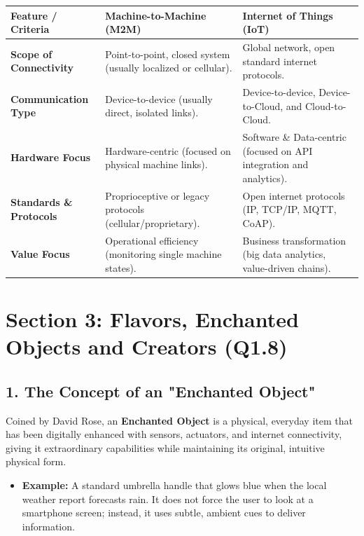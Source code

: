 \begin{table}[H]
\centering
\begin{tabular}{|p{}|p{}|p{}|}
\hline
Feature / Criteria & Machine-to-Machine (M2M) & Internet of Things (IoT) \\
\hline
\textbf{Scope of Connectivity} & Point-to-point, closed system (usually localized or cellular). & Global network, open standard internet protocols. \\
\hline
\textbf{Communication Type} & Device-to-device (usually direct, isolated links). & Device-to-device, Device-to-Cloud, and Cloud-to-Cloud. \\
\hline
\textbf{Hardware Focus} & Hardware-centric (focused on physical machine links). & Software \& Data-centric (focused on API integration and analytics). \\
\hline
\textbf{Standards \& Protocols} & Proprioceptive or legacy protocols (cellular/proprietary). & Open internet protocols (IP, TCP/IP, MQTT, CoAP). \\
\hline
\textbf{Value Focus} & Operational efficiency (monitoring single machine states). & Business transformation (big data analytics, value-driven chains). \\
\hline
\end{tabular}
\end{table}


\section{Section 3: Flavors, Enchanted Objects and Creators (Q1.8)}

\subsection{1. The Concept of an "Enchanted Object"}
Coined by David Rose, an \textbf{Enchanted Object} is a physical, everyday item that has been digitally enhanced with sensors, actuators, and internet connectivity, giving it extraordinary capabilities while maintaining its original, intuitive physical form.
\begin{itemize}
  \item   \textbf{Example:} A standard umbrella handle that glows blue when the local weather report forecasts rain. It does not force the user to look at a smartphone screen; instead, it uses subtle, ambient cues to deliver information.
\end{itemize}

